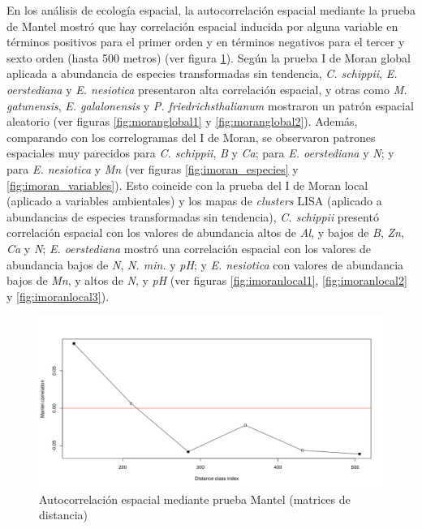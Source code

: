 \documentclass[11pt,]{article}
\begin{document}
En los análisis de ecología espacial, la autocorrelación espacial
mediante la prueba de Mantel mostró que hay correlación espacial
inducida por alguna variable en términos positivos para el primer orden
y en términos negativos para el tercer y sexto orden (hasta 500 metros)
(ver figura \ref{fig:prueba_mantel}). Según la prueba I de Moran global
aplicada a abundancia de especies transformadas sin tendencia, \emph{C.
schippii}, \emph{E. oerstediana} y \emph{E. nesiotica} presentaron alta
correlación espacial, y otras como \emph{M. gatunensis}, \emph{E.
galalonensis} y \emph{P. friedrichsthalianum} mostraron un patrón
espacial aleatorio (ver figuras \ref{fig:moranglobal1} y
\ref{fig:moranglobal2}). Además, comparando con los correlogramas del I
de Moran, se observaron patrones espaciales muy parecidos para \emph{C.
schippii}, \emph{B} y \emph{Ca}; para \emph{E. oerstediana} y \emph{N};
y para \emph{E. nesiotica} y \emph{Mn} (ver figuras
\ref{fig:imoran_especies} y \ref{fig:imoran_variables}). Esto coincide
con la prueba del I de Moran local (aplicado a variables ambientales) y
los mapas de \emph{clusters} LISA (aplicado a abundancias de especies
transformadas sin tendencia), \emph{C. schippii} presentó correlación
espacial con los valores de abundancia altos de \emph{Al}, y bajos de
\emph{B}, \emph{Zn}, \emph{Ca} y \emph{N}; \emph{E. oerstediana} mostró
una correlación espacial con los valores de abundancia bajos de
\emph{N}, \emph{N. min.} y \emph{pH}; y \emph{E. nesiotica} con valores
de abundancia bajos de \emph{Mn}, y altos de \emph{N}, y \emph{pH} (ver
figuras \ref{fig:imoranlocal1}, \ref{fig:imoranlocal2} y
\ref{fig:imoranlocal3}).

\begin{figure}
\centering
\includegraphics{prueba_mantel.png}
\caption{Autocorrelación espacial mediante prueba Mantel (matrices de
distancia) \label{fig:prueba_mantel}}
\end{figure}
\end{document}
